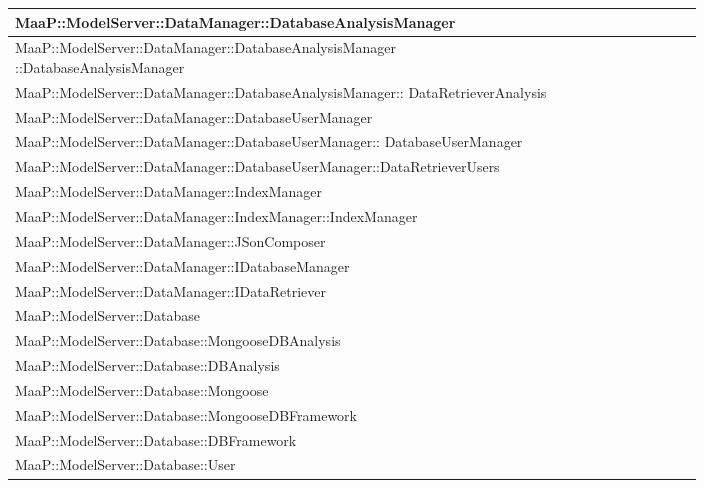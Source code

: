 \begin{center}
\begin{longtable}{|p{0.8\linewidth}|c|}
\midrule
MaaP::ModelServer::DataManager::DatabaseAnalysisManager 
& \\

\midrule 
MaaP::ModelServer::DataManager::DatabaseAnalysisManager ::DatabaseAnalysisManager 
& \\

\midrule
MaaP::ModelServer::DataManager::DatabaseAnalysisManager:: DataRetrieverAnalysis 
& \\

\midrule 
MaaP::ModelServer::DataManager::DatabaseUserManager 
& \\

\midrule 
MaaP::ModelServer::DataManager::DatabaseUserManager:: DatabaseUserManager
& \\

\midrule 
MaaP::ModelServer::DataManager::DatabaseUserManager::DataRetrieverUsers
& \\

\midrule 
MaaP::ModelServer::DataManager::IndexManager
& \\

\midrule 
MaaP::ModelServer::DataManager::IndexManager::IndexManager
& \\

\midrule 
MaaP::ModelServer::DataManager::JSonComposer
& \\

\midrule 
MaaP::ModelServer::DataManager::IDatabaseManager
& \\

\midrule 
MaaP::ModelServer::DataManager::IDataRetriever
& \\

\midrule 
MaaP::ModelServer::Database
& \\

\midrule 
MaaP::ModelServer::Database::MongooseDBAnalysis
& \\

\midrule 
MaaP::ModelServer::Database::DBAnalysis
& \\

\midrule 
MaaP::ModelServer::Database::Mongoose
& \\

\midrule 
MaaP::ModelServer::Database::MongooseDBFramework
& \\

\midrule 
MaaP::ModelServer::Database::DBFramework
& \\

\midrule 
MaaP::ModelServer::Database::User
& \\


\end{longtable}
\end{center}

